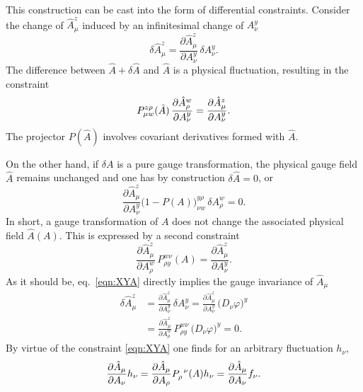 \documentclass[twocolumn,aps,prd,amsmath,amssymb,preprintnumbers,longbibliography]{revtex4-1}
\numberwithin{equation}{section}
\newenvironment{alignedeqn}{\begin{equation}\begin{aligned}}{\end{aligned}\end{equation}\ignorespacesafterend}
\begin{document}
This construction can be cast into the form of differential constraints. Consider the change of $\hat{A}_\mu^z$ induced by an infinitesimal change of $A_\nu^y$
\begin{equation}\label{eqn:CA}
	\delta \hat{A}_\mu^z
	= \frac{\partial \hat{A}_\mu^z}{\partial A_\nu^y} \, \delta A_\nu^y.
\end{equation}
The difference between $\hat{A} + \delta \hat{A}$ and $\hat{A}$ is a physical fluctuation, resulting in the constraint
\begin{equation}\label{eqn:275A}
	\tensor*{P}{_\mu_w^z^\rho}(\hat{A}) \, \frac{\partial\hat{A}_\rho^w}{\partial A_\nu^y}
	= \frac{\partial\hat{A}_\mu^z}{\partial A_\nu^y}.
\end{equation}
The projector $P(\hat{A})$ involves covariant derivatives formed with $\hat{A}$.

On the other hand, if $\delta A$ is a pure gauge transformation, the physical gauge field $\hat{A}$ remains unchanged and one has by construction $\delta \hat{A} = 0$, or
\begin{equation}\label{eqn:CB}
	\frac{\partial \hat{A}_\mu^z}{\partial A_\nu^y} \bigl(1 - P(A)\bigr)_{\nu w}^{y \rho} \, \delta A_\rho^w
	= 0.
\end{equation}
In short, a gauge transformation of $A$ does not change the associated physical field $\hat{A}(A)$. This is expressed by a second constraint
\begin{equation}\label{eqn:XYA}
	\frac{\partial \hat{A}_\mu^z}{\partial A_\rho^w} \, P_{\rho y}^{w \nu}(A)
	= \frac{\partial \hat{A}_\mu^z}{\partial A_\nu^y}.
\end{equation}
As it should be, eq.~\eqref{eqn:XYA} directly implies the gauge invariance of $\hat{A}_\mu$
\begin{alignedeqn}\label{eqn:XYB}
	\delta \hat{A}_\mu^z
	&= \frac{\partial \hat{A}_\mu^z}{\partial A_\nu^y} \, \delta A_\nu^y
	= \frac{\partial \hat{A}_\mu^z}{\partial A_\nu^y} \, \bigl(D_\nu \varphi\bigr)^y\\
	&= \frac{\partial \hat{A}_\mu^z}{\partial A_\rho^w} \, P_{\rho y}^{w \nu} \, \bigl(D_\nu \varphi\bigr)^y
	= 0.
\end{alignedeqn}
By virtue of the constraint \eqref{eqn:XYA} one finds for an arbitrary fluctuation $h_\nu$,
\begin{equation}\label{eqn:275B}
	\frac{\partial\hat{A}_\mu}{\partial A_\nu} h_\nu
	= \frac{\partial\hat{A}_\mu}{\partial A_\rho} \tensor{P}{_\rho^\nu}(A) h_\nu
	= \frac{\partial\hat{A}_\mu}{\partial A_\nu} f_\nu.
\end{equation}
\end{document}
